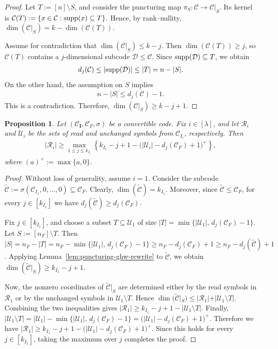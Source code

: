 \documentclass[conference, 10pt]{IEEEtran}
\theoremstyle{plain}
\newtheorem{proposition}[theorem]{Proposition}
\theoremstyle{definition}
\newcommand{\supp}{\textup{supp}}
\newcommand{\mC}{\mathcal{C}}
\newcommand{\mU}{\mathcal{U}}
\newcommand{\mR}{\mathcal{R}}
\newcommand{\mD}{\mathcal{D}}
\begin{document}
\begin{proof}
Let $T:=[n]\setminus S$, and consider the puncturing map $\pi_S\colon \mC\longrightarrow \mC|_S.$
Its kernel is $\mC(T):=\{x\in \mC : \supp(x)\subseteq T\}.$
Hence, by rank--nullity,
$\dim(\mC|_S)=k-\dim(\mC(T))$. 

Assume for contradiction that $\dim(\mC|_S)\le k-j$. Then $\dim(\mC(T))\ge j$, so $\mC(T)$ contains a $j$-dimensional subcode $\mD\le \mC$. Since $\supp(\mD)\subseteq T$, we obtain
\begin{align*} d_j(\mC)\le |\supp(\mD)|\le |T|=n-|S|. \end{align*}
On the other hand, the assumption on $S$ implies
\begin{align*} n-|S|\le d_j(\mC)-1. \end{align*}
This is a contradiction. Therefore, $\dim(\mC|_S)\ge k-j+1$.
\end{proof}


\begin{proposition}\label{prop:readlower}
Let $(\mC_{\textbf{I}},\mC_F,\sigma)$ be a convertible code. Fix $i\in [\lambda]$, and let $\mR_i$ and $\mU_i$ be the sets of read and unchanged symbols from $\mC_{I_i}$, respectively. Then
\begin{align*} |\mR_i|\ge \max_{1\le j\le k_{I_i}}\left\{ k_{I_i}-j+1-\bigl(|\mU_i|-d_j(\mC_F)+1\bigr)^+ \right\}, \end{align*}
where $(a)^+:=\max\{a,0\}$.
\end{proposition}

\begin{proof}
Without loss of generality, assume $i=1$. Consider the subcode $\widetilde{\mC}:=\sigma(\mC_{I_1},0,\dots,0)\subseteq \mC_F$. Clearly, $\dim(\widetilde{\mC})=k_{I_1}$. Moreover, since $\widetilde{\mC}\le \mC_F$, for every $j\in [k_{I_1}]$ we have
$d_j(\widetilde{\mC})\ge d_j(\mC_F).$

Fix $j\in [k_{I_1}]$, and choose a subset $T\subseteq \mU_1$ of size $|T|=\min\{|\mU_1|,\, d_j(\mC_F)-1\}$. 
Let $S:=[n_F]\setminus T$. Then $|S|=n_F-|T|=n_F-\min\{|\mU_1|,\, d_j(\mC_F)-1\}\ge n_F-d_j(\mC_F)+1\ge n_F-d_j(\widetilde{\mC})+1$. Applying Lemma~\ref{lem:puncturing-ghw-rewrite} to $\widetilde{\mC}$, we obtain
$\dim(\widetilde{\mC}|_S)\ge k_{I_1}-j+1$. 

Now, the nonzero coordinates of $\widetilde{\mC}|_S$ are determined either by the read symbols in $\mR_1$ or by the unchanged symbols in $\mU_1\setminus T$. Hence $\dim(\widetilde{\mC}|_S)\le |\mR_1|+|\mU_1\setminus T|$. Combining the two inequalities gives $|\mR_1|\ge k_{I_1}-j+1-|\mU_1\setminus T|$. Finally,
$|\mU_1\setminus T|=|\mU_1|-\min\{|\mU_1|,\, d_j(\mC_F)-1\}=\bigl(|\mU_1|-d_j(\mC_F)+1\bigr)^+$. Therefore we have
$|\mR_1|\ge k_{I_1}-j+1-\bigl(|\mU_1|-d_j(\mC_F)+1\bigr)^+$. Since this holds for every $j\in [k_{I_1}]$, taking the maximum over $j$ completes the proof.
\end{proof}
\end{document}
